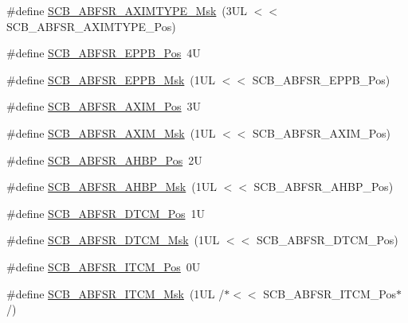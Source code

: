 \begin{DoxyCompactItemize}
\#define \mbox{\hyperlink{group___c_m_s_i_s___s_c_b_ga91783597f0721644a1ab1919755bb6ee}{S\+C\+B\+\_\+\+A\+B\+F\+S\+R\+\_\+\+A\+X\+I\+M\+T\+Y\+P\+E\+\_\+\+Msk}}~(3\+U\+L $<$$<$ S\+C\+B\+\_\+\+A\+B\+F\+S\+R\+\_\+\+A\+X\+I\+M\+T\+Y\+P\+E\+\_\+\+Pos)
\item 
\#define \mbox{\hyperlink{group___c_m_s_i_s___s_c_b_ga2d943581f93e2425e0a22a0d45b9f0a6}{S\+C\+B\+\_\+\+A\+B\+F\+S\+R\+\_\+\+E\+P\+P\+B\+\_\+\+Pos}}~4U
\item 
\#define \mbox{\hyperlink{group___c_m_s_i_s___s_c_b_gac7bbc98af76d3de2713a0eb0c6c2e613}{S\+C\+B\+\_\+\+A\+B\+F\+S\+R\+\_\+\+E\+P\+P\+B\+\_\+\+Msk}}~(1\+U\+L $<$$<$ S\+C\+B\+\_\+\+A\+B\+F\+S\+R\+\_\+\+E\+P\+P\+B\+\_\+\+Pos)
\item 
\#define \mbox{\hyperlink{group___c_m_s_i_s___s_c_b_ga48c7a6de20e2823c0dc74d78c5ef7992}{S\+C\+B\+\_\+\+A\+B\+F\+S\+R\+\_\+\+A\+X\+I\+M\+\_\+\+Pos}}~3U
\item 
\#define \mbox{\hyperlink{group___c_m_s_i_s___s_c_b_gac24348e5ec8392f4a076c7ba690aae48}{S\+C\+B\+\_\+\+A\+B\+F\+S\+R\+\_\+\+A\+X\+I\+M\+\_\+\+Msk}}~(1\+U\+L $<$$<$ S\+C\+B\+\_\+\+A\+B\+F\+S\+R\+\_\+\+A\+X\+I\+M\+\_\+\+Pos)
\item 
\#define \mbox{\hyperlink{group___c_m_s_i_s___s_c_b_ga5c97d4cc05972dc80963e74eb2332841}{S\+C\+B\+\_\+\+A\+B\+F\+S\+R\+\_\+\+A\+H\+B\+P\+\_\+\+Pos}}~2U
\item 
\#define \mbox{\hyperlink{group___c_m_s_i_s___s_c_b_gabfc67aa93bca5ddd4b0f0a47b372383e}{S\+C\+B\+\_\+\+A\+B\+F\+S\+R\+\_\+\+A\+H\+B\+P\+\_\+\+Msk}}~(1\+U\+L $<$$<$ S\+C\+B\+\_\+\+A\+B\+F\+S\+R\+\_\+\+A\+H\+B\+P\+\_\+\+Pos)
\item 
\#define \mbox{\hyperlink{group___c_m_s_i_s___s_c_b_ga46e22bfb92f4344807714dfa987b7cf3}{S\+C\+B\+\_\+\+A\+B\+F\+S\+R\+\_\+\+D\+T\+C\+M\+\_\+\+Pos}}~1U
\item 
\#define \mbox{\hyperlink{group___c_m_s_i_s___s_c_b_ga0f48b9b3b5e79c83383ff9506a75f423}{S\+C\+B\+\_\+\+A\+B\+F\+S\+R\+\_\+\+D\+T\+C\+M\+\_\+\+Msk}}~(1\+U\+L $<$$<$ S\+C\+B\+\_\+\+A\+B\+F\+S\+R\+\_\+\+D\+T\+C\+M\+\_\+\+Pos)
\item 
\#define \mbox{\hyperlink{group___c_m_s_i_s___s_c_b_gaf7c22a977aed73cd51317c25286e81c6}{S\+C\+B\+\_\+\+A\+B\+F\+S\+R\+\_\+\+I\+T\+C\+M\+\_\+\+Pos}}~0U
\item 
\#define \mbox{\hyperlink{group___c_m_s_i_s___s_c_b_gaa8cd31cf3adbe7445c733c0a0a4779da}{S\+C\+B\+\_\+\+A\+B\+F\+S\+R\+\_\+\+I\+T\+C\+M\+\_\+\+Msk}}~(1\+U\+L /$\ast$$<$$<$ S\+C\+B\+\_\+\+A\+B\+F\+S\+R\+\_\+\+I\+T\+C\+M\+\_\+\+Pos$\ast$/)
$$
\end{DoxyCompactItemize}
